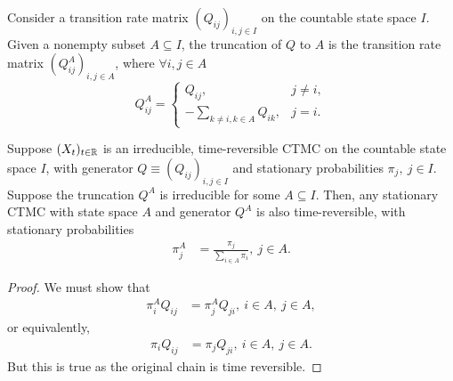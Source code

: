 \documentclass[a4paper,10pt,english]{article}
\begin{document}
\begin{shaded*}
\begin{exmp}

\begin{defn}
Consider a transition rate matrix $(Q_{ij})_{i, j \in I}$ on the countable state space $I$. Given a nonempty subset $A \subseteq I$, the truncation of $Q$ to $A$ is the transition rate matrix $(Q^A_{ij})_{i, j \in A}$, where $\forall i, j \in A$
\[ Q^A_{ij} = \begin{cases}
Q_{ij}, & j \neq i, \\
-\sum_{k \neq i, k \in A} Q_{ik}, &  j = i.
\end{cases}
\]
\end{defn}

\begin{prop}
Suppose $(X_t)_{t \in \mathbb{R}}$ is an irreducible, time-reversible CTMC on the countable state space $I$, with generator $Q \equiv (Q_{ij})_{i, j \in I}$ and stationary probabilities $\pi_j,~ j \in I$. Suppose the truncation $Q^A$ is irreducible for some $A \subseteq I$. Then, any stationary CTMC with state space $A$ and generator $Q^A$ is also time-reversible, with stationary probabilities
\begin{align*}
\pi_j^A&=\frac{\pi_j}{\sum_{i \in A}\pi_i},~ j \in A.
\end{align*}
\end{prop}
\begin{proof}
We must show that 
\begin{align*}
\pi_i^AQ_{ij}&=\pi_j^AQ_{ji},~ i \in A,~ j \in A,
\end{align*}
or equivalently,
\begin{align*} 
\pi_iQ_{ij}&=\pi_jQ_{ji},~ i \in A,~ j \in A.
\end{align*}
But this is true as the original chain is time reversible.
\end{proof}

\end{exmp}
\end{shaded*}
\end{document}
